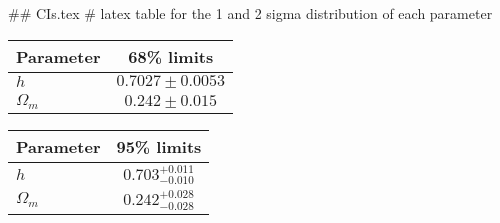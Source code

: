## CIs.tex
# latex table for the 1 and 2 sigma distribution of each parameter

\begin{tabular} { l  c}
 Parameter &  68\% limits\\
\hline
{\boldmath$h              $} & $0.7027\pm 0.0053          $\\
{\boldmath$\Omega_m       $} & $0.242\pm 0.015            $\\
\hline
\end{tabular}

\begin{tabular} { l  c}
 Parameter &  95\% limits\\
\hline
{\boldmath$h              $} & $0.703^{+0.011}_{-0.010}   $\\
{\boldmath$\Omega_m       $} & $0.242^{+0.028}_{-0.028}   $\\
\hline
\end{tabular}
